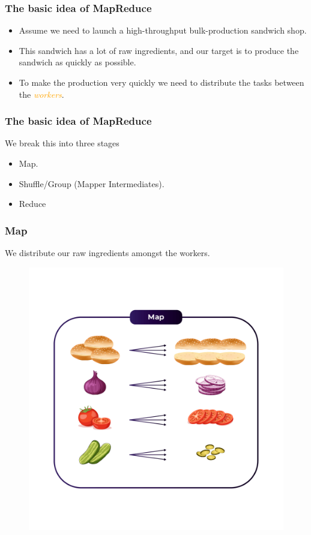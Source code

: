 \begin{frame}
    \frametitle{The basic idea of MapReduce}
    \begin{itemize}
        [<+->]
        \item Assume we need to launch a high-throughput bulk-production sandwich shop.
        \item This sandwich has a lot of raw ingredients, and our target is to produce the sandwich as quickly as possible.
        \item To make the production very quickly we need to distribute the tasks between the  \textcolor{orange}{\textit{workers}}.
    \end{itemize}
\end{frame}
\begin{frame}
    \frametitle{The basic idea of MapReduce}
    We break this into three stages
    \begin{itemize}
        [<+->]
        \item Map.
        \item Shuffle/Group (Mapper Intermediates).
        \item Reduce
    \end{itemize}
\end{frame}
\begin{frame}
    \frametitle{Map}
    We distribute our raw ingredients amongst the workers.
    \begin{figure}
        \includegraphics[width=.5\textwidth,height=.8\textheight]{./Figures/chapter-04/map}\label{fig:map}
    \end{figure}
\end{frame}
